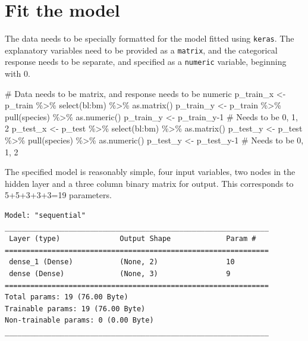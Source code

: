\documentclass[
  letterpaper,
]{krantz}
\newenvironment{Shaded}{\begin{snugshade}}{\end{snugshade}}
\newcommand{\CommentTok}[1]{\textcolor[rgb]{0.37,0.37,0.37}{#1}}
\newcommand{\DecValTok}[1]{\textcolor[rgb]{0.68,0.00,0.00}{#1}}
\newcommand{\FunctionTok}[1]{\textcolor[rgb]{0.28,0.35,0.67}{#1}}
\newcommand{\NormalTok}[1]{\textcolor[rgb]{0.00,0.23,0.31}{#1}}
\newcommand{\OtherTok}[1]{\textcolor[rgb]{0.00,0.23,0.31}{#1}}
\newcommand{\SpecialCharTok}[1]{\textcolor[rgb]{0.37,0.37,0.37}{#1}}
\begin{document}
\section{Fit the model}\label{fit-the-model}


The data needs to be specially formatted for the model fitted using
\texttt{keras}. The explanatory variables need to be provided as a
\texttt{matrix}, and the categorical response needs to be separate, and
specified as a \texttt{numeric} variable, beginning with 0.

\begin{Shaded}
\begin{Highlighting}[]
\CommentTok{\# Data needs to be matrix, and response needs to be numeric}
\NormalTok{p\_train\_x }\OtherTok{\textless{}{-}}\NormalTok{ p\_train }\SpecialCharTok{\%\textgreater{}\%}
  \FunctionTok{select}\NormalTok{(bl}\SpecialCharTok{:}\NormalTok{bm) }\SpecialCharTok{\%\textgreater{}\%}
  \FunctionTok{as.matrix}\NormalTok{()}
\NormalTok{p\_train\_y }\OtherTok{\textless{}{-}}\NormalTok{ p\_train }\SpecialCharTok{\%\textgreater{}\%} \FunctionTok{pull}\NormalTok{(species) }\SpecialCharTok{\%\textgreater{}\%} \FunctionTok{as.numeric}\NormalTok{() }
\NormalTok{p\_train\_y }\OtherTok{\textless{}{-}}\NormalTok{ p\_train\_y}\DecValTok{{-}1} \CommentTok{\# Needs to be 0, 1, 2}
\NormalTok{p\_test\_x }\OtherTok{\textless{}{-}}\NormalTok{ p\_test }\SpecialCharTok{\%\textgreater{}\%}
  \FunctionTok{select}\NormalTok{(bl}\SpecialCharTok{:}\NormalTok{bm) }\SpecialCharTok{\%\textgreater{}\%}
  \FunctionTok{as.matrix}\NormalTok{()}
\NormalTok{p\_test\_y }\OtherTok{\textless{}{-}}\NormalTok{ p\_test }\SpecialCharTok{\%\textgreater{}\%} \FunctionTok{pull}\NormalTok{(species) }\SpecialCharTok{\%\textgreater{}\%} \FunctionTok{as.numeric}\NormalTok{() }
\NormalTok{p\_test\_y }\OtherTok{\textless{}{-}}\NormalTok{ p\_test\_y}\DecValTok{{-}1} \CommentTok{\# Needs to be 0, 1, 2}
\end{Highlighting}
\end{Shaded}

The specified model is reasonably simple, four input variables, two
nodes in the hidden layer and a three column binary matrix for output.
This corresponds to 5+5+3+3+3=19 parameters.

\begin{verbatim}
Model: "sequential"
______________________________________________________________
 Layer (type)              Output Shape             Param #   
==============================================================
 dense_1 (Dense)           (None, 2)                10        
 dense (Dense)             (None, 3)                9         
==============================================================
Total params: 19 (76.00 Byte)
Trainable params: 19 (76.00 Byte)
Non-trainable params: 0 (0.00 Byte)
______________________________________________________________
\end{verbatim}
\end{document}
